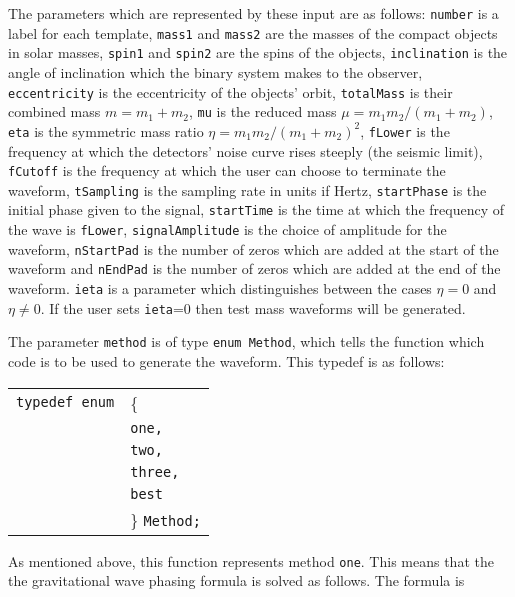 \documentclass[12pt]{article}
\begin{document}
The parameters which are represented by these input are as follows: \texttt{number} is a label for each template, \texttt{mass1} and \texttt{mass2} are the masses of the compact objects in solar masses, \texttt{spin1} and \texttt{spin2} are the spins of the objects, \texttt{inclination} is the angle of inclination which the binary system makes to the observer, \texttt{eccentricity} is the eccentricity of the objects' orbit, \texttt{totalMass} is their combined mass $m=m_{1}+m_{2}$, \texttt{mu} is the reduced mass $\mu=m_{1}m_{2}/(m_{1}+m_{2})$, \texttt{eta} is the symmetric mass ratio $\eta=m_{1}m_{2}/(m_{1}+m_{2})^{2}$, \texttt{fLower} is the frequency at which the detectors' noise curve rises steeply (the seismic limit), \texttt{fCutoff} is the frequency at which the user can choose to terminate the waveform, \texttt{tSampling} is the sampling rate in units if Hertz, \texttt{startPhase} is the initial phase given to the signal, \texttt{startTime} is the time at which the frequency of the wave is \texttt{fLower},  \texttt{signalAmplitude} is the choice of amplitude for the waveform, \texttt{nStartPad} is the number of zeros which are added at the start of the waveform and \texttt{nEndPad} is the number of zeros which are added at the end of the waveform. \texttt{ieta} is a parameter which distinguishes between the cases $\eta=0$ and $\eta \neq 0$. If the user sets \texttt{ieta}=0 then test mass waveforms will be generated.

The parameter \texttt{method} is of type \texttt{enum Method}, which tells the function which code is to be used to generate the waveform. This typedef is as follows:

\vspace{5mm}

\begin{tabular}{ll}
\texttt{typedef enum} & \{ \\
                      & \texttt{one,} \\
                      & \texttt{two,}  \\
                      & \texttt{three,} \\
                      & \texttt{best} \\
                      & \} \texttt{Method;}
\end{tabular}

\vspace{5mm}

As mentioned above, this function represents method \texttt{one}. This means that the the gravitational wave phasing formula is solved as follows. The formula is
\end{document}

